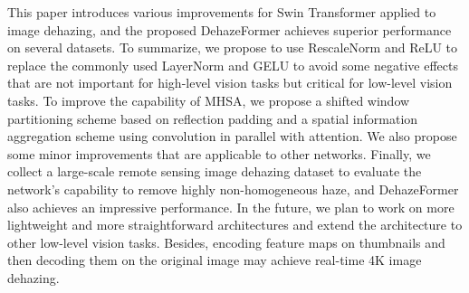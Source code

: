 \documentclass[journal]{IEEEtran}
\begin{document}
This paper introduces various improvements for Swin Transformer applied to image dehazing, and the proposed DehazeFormer achieves superior performance on several datasets.
To summarize, we propose to use RescaleNorm and ReLU to replace the commonly used LayerNorm and GELU to avoid some negative effects that are not important for high-level vision tasks but critical for low-level vision tasks.
To improve the capability of MHSA, we propose a shifted window partitioning scheme based on reflection padding and a spatial information aggregation scheme using convolution in parallel with attention. 
We also propose some minor improvements that are applicable to other networks.
Finally, we collect a large-scale remote sensing image dehazing dataset to evaluate the network's capability to remove highly non-homogeneous haze, and DehazeFormer also achieves an impressive performance.
In the future, we plan to work on more lightweight and more straightforward architectures and extend the architecture to other low-level vision tasks. 
Besides, encoding feature maps on thumbnails and then decoding them on the original image may achieve real-time 4K image dehazing.
 


{\small


}
\end{document}
